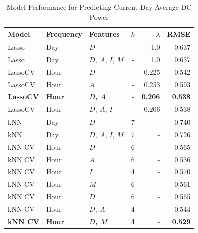 \begin{table}[h]
    \centering
    \caption{Model Performance for Predicting Current Day Average DC Power}
    \begin{tabular}{|l|l|l|r|r|r|} 
    \hline
    \textbf{Model} & \textbf{Frequency} & \textbf{Features} & \textbf{$k$} & \textbf{$\lambda$} & \textbf{RMSE} \\ \hline
    Lasso & Day & $D$ & - & 1.0 & 0.637 \\ \hline
    Lasso & Day & $D$, $A$, $I$, $M$ & - & 1.0 & 0.637 \\ \hline
    LassoCV & Hour & $D$ & - & 0.225 & 0.542 \\ \hline
    LassoCV & Hour & $A$ & - & 0.253 & 0.593 \\ \hline
    \textbf{LassoCV} & \textbf{Hour} & \textbf{$D$, $A$} & - & \textbf{0.206} & \textbf{0.538} \\ \hline
    LassoCV & Hour & $D$, $A$, $I$ & - & 0.206 & 0.538 \\ \hline
    kNN & Day & $D$ & 7 & - & 0.740 \\ \hline
    kNN & Day & $D$, $A$, $I$, $M$ & 7 & - & 0.726 \\ \hline
    kNN CV & Hour & $D$ & 6 & - & 0.565 \\ \hline
    kNN CV & Hour & $A$ & 6 & - & 0.536 \\ \hline
    kNN CV & Hour & $I$ & 4 & - & 0.570 \\ \hline
    kNN CV & Hour & $M$ & 6 & - & 0.561 \\ \hline
    kNN CV & Hour & $D$ & 6 & - & 0.565 \\ \hline
    kNN CV & Hour & $D$, $A$ & 4 & - & 0.544 \\ \hline
    \textbf{kNN CV} & \textbf{Hour} & \textbf{$D$, $M$} & \textbf{4} & - & \textbf{0.529} \\ \hline
    \end{tabular}
    \label{tab:model_comparison}
\end{table}
